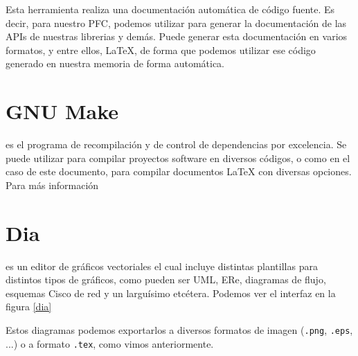 Esta herramienta realiza una documentación automática de código
fuente. Es decir, para nuestro PFC, podemos utilizar para generar la
documentación de las APIs de nuestras librerias y demás. Puede generar
esta documentación en varios formatos, y entre ellos, \LaTeX, de forma
que podemos utilizar ese código generado en nuestra memoria de forma
automática.

\section*{GNU Make}

 es el programa de recompilación y de control de
dependencias por excelencia. Se puede utilizar para compilar proyectos
software en diversos códigos, o como en el caso de este documento,
para compilar documentos \LaTeX{} con diversas opciones.\\

Para más información \cite{pdf:make}

\section*{Dia}

 es un editor de gráficos vectoriales el cual incluye
distintas plantillas para distintos tipos de gráficos, como pueden ser
UML, ERe, diagramas de flujo, esquemas Cisco de red y un larguísimo
etcétera. Podemos ver el interfaz en la figura \ref{dia}


Estos diagramas podemos exportarlos a diversos formatos de imagen
(\texttt{.png}, \texttt{.eps}, ...) o a formato \texttt{.tex}, como
vimos anteriormente.
